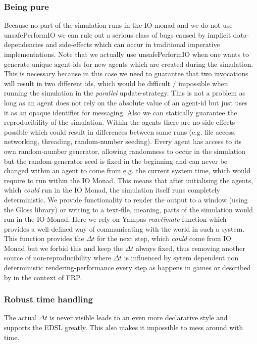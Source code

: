 \subsubsection{Being pure}
Because no part of the simulation runs in the IO monad and we do not use unsafePerformIO we can rule out a serious class of bugs caused by implicit data-dependencies and side-effects which can occur in traditional imperative implementations. Note that we actually use unsafePerformIO when one wants to generate unique agent-ids for new agents which are created during the simulation. This is necessary because in this case we need to guarantee that two invocations will result in two different ids, which would be difficult / impossible when running the simulation in the \textit{parallel} update-strategy. This is not a problem as long as an agent does not rely on the absolute value of an agent-id but just uses it as an opaque identifier for messaging.
Also we can statically guarantee the reproducibility of the simulation. Within the agents there are no side effects possible which could result in differences between same runs (e.g. file access, networking, threading, random-number seeding). Every agent has access to its own random-number generator, allowing randomness to occur in the simulation but the random-generator seed is fixed in the beginning and can never be changed within an agent to come from e.g. the current system time, which would require to run within the IO Monad. This means that after initialising the agents, which \textit{could} run in the IO Monad, the simulation itself runs completely deterministic.
We provide functionality to render the output to a window (using the Gloss library) or writing to a text-file, meaning, parts of the simulation would run in the IO Monad. Here we rely on Yampas \textit{reactimate} function which provides a well-defined way of communicating with the world in such a system. This function provides the $\Delta t$ for the next step, which \textit{could} come from IO Monad but we forbid this and keep the $\Delta t$ always fixed, thus removing another source of non-reproducibility where $\Delta t$ is influenced by sytem dependent non deterministic rendering-performance every step as happens in games or described by \cite{perez_testing_2017} in the context of FRP.

\subsubsection{Robust time handling}
The actual $\Delta t$ is never visible leads to an even more declarative style and supports the EDSL greatly. This also makes it impossible to mess around with time.

